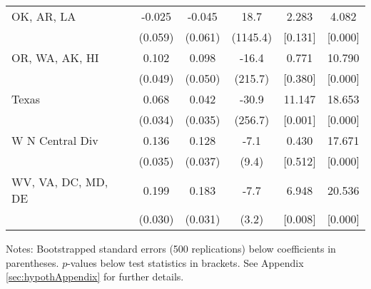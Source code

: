 \begin{landscape}
\begin{table}[ht]
{\begin{threeparttable}
\begin{tabular}{lccccc}
OK, AR, LA & -0.025 & -0.045 & 18.7 & 2.283 & 4.082 \\ 
 & (0.059) & (0.061) & (1145.4) & [0.131] & [0.000] \\ 
OR, WA, AK, HI & 0.102 & 0.098 & -16.4 & 0.771 & 10.790 \\ 
 & (0.049) & (0.050) & (215.7) & [0.380] & [0.000] \\ 
Texas & 0.068 & 0.042 & -30.9 & 11.147 & 18.653 \\ 
 & (0.034) & (0.035) & (256.7) & [0.001] & [0.000] \\ 
W N Central Div & 0.136 & 0.128 & -7.1 & 0.430 & 17.671 \\ 
 & (0.035) & (0.037) & (9.4) & [0.512] & [0.000] \\ 
WV, VA, DC, MD, DE & 0.199 & 0.183 & -7.7 & 6.948 & 20.536 \\ 
 & (0.030) & (0.031) & (3.2) & [0.008] & [0.000] \\ 
\bottomrule
\end{tabular}
{\footnotesize {\raggedright Notes: Bootstrapped standard errors (500 replications) below coefficients in parentheses. $p$-values below test statistics in brackets. See Appendix \ref{sec:hypothAppendix} for further details.}}
\end{threeparttable}
}
\end{table}
\end{landscape}

